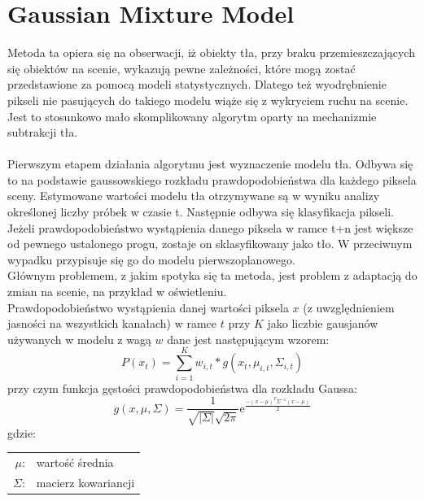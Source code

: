 \section{Gaussian Mixture Model}
\label{sec:GMM}
Metoda ta \cite{zivkovic2004improved} opiera się na obserwacji, iż obiekty tła, przy braku przemieszczających się obiektów na scenie, wykazują pewne zależności, które mogą zostać przedstawione za pomocą modeli statystycznych. Dlatego też wyodrębnienie pikseli nie pasujących do takiego modelu wiąże się z wykryciem ruchu na scenie. Jest to stosunkowo mało skomplikowany algorytm oparty na mechanizmie subtrakcji tła.
\paragraph{}
Pierwszym etapem działania algorytmu jest wyznaczenie modelu tła. Odbywa się to na podstawie gaussowskiego rozkładu prawdopodobieństwa dla każdego piksela sceny. Estymowane wartości modelu tła otrzymywane są w wyniku analizy określonej liczby próbek w czasie t. Następnie odbywa się klasyfikacja pikseli. Jeżeli prawdopodobieństwo wystąpienia danego piksela w ramce t+n jest większe od pewnego ustalonego progu, zostaje on sklasyfikowany jako tło. W przeciwnym wypadku przypisuje się go do modelu pierwszoplanowego.\\
Głównym problemem, z jakim spotyka się ta metoda, jest problem z adaptacją do zmian na scenie, na przykład w oświetleniu.\\
Prawdopodobieństwo wystąpienia danej wartości piksela $x$ (z uwzględnieniem jasności na wszystkich kanałach) w ramce $t$ przy $K$ jako liczbie gausjanów używanych w modelu z wagą $w$ dane jest następującym wzorem:
\begin{equation}
P(x_{t}) = \sum_{i=1}^{K} w_{i,t}*g(x_{t},\mu_{i,t},\Sigma_{i,t})
\end{equation}
przy czym funkcja gęstości prawdopodobieństwa dla rozkładu Gaussa:
\begin{equation}
g(x,\mu,\Sigma) = \frac{1}{\sqrt{|\Sigma|}\sqrt{2\pi}}\mathrm{e}^\frac{-(x-\mu)^T\Sigma^{-1}(x-\mu)}{2}
\end{equation}
gdzie:\\ 
\hspace*{3em}
\begin{tabular}{r l}
$\mu$: & wartość średnia \\
$\Sigma$: & macierz kowariancji
\end{tabular} \\

